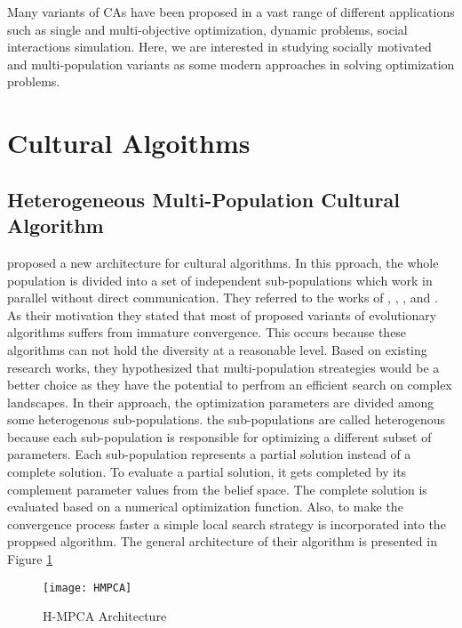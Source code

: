 \label{chapter:problem}

\newlength{\savedunitlength}
\setlength{\unitlength}{2em}

Many variants of CAs have been proposed in a vast range of different applications such as single and multi-objective optimization, dynamic problems, social interactions simulation. Here, we are interested in studying socially motivated and multi-population variants as some modern approaches in solving optimization problems.
\section{Cultural Algoithms}
\subsection{Heterogeneous Multi-Population Cultural Algorithm}
\cite{kobti2013heterogeneous} proposed a new architecture for cultural algorithms. In this pproach, the whole population is divided into a set of independent sub-populations which work in parallel without direct communication. They referred to the works of \cite{xu2010novel}, \cite{guo2011novel}, \cite{vasile2011inflationary}, and \cite{sharma2011reserve}. As their motivation they stated that most of proposed variants of evolutionary algorithms suffers from immature convergence. This occurs because these algorithms can not hold the diversity at a reasonable level. Based on existing research works, they hypothesized that multi-population streategies would be a better choice as they have the potential to perfrom an efficient search on complex landscapes. In their approach, the optimization parameters are divided among some heterogenous sub-populations. the sub-populations are called heterogenous because each sub-population is responsible for optimizing a different subset of parameters. Each sub-population represents a partial solution instead of a complete solution. To evaluate a partial solution, it gets completed by its complement parameter values from the belief space. The complete solution is evaluated based on a numerical optimization function. Also, to make the convergence process faster a simple local search strategy is incorporated into the proppsed algorithm. The general architecture of their algorithm is presented in Figure \ref{fig:HPMCA} \newline
\begin{figure}[h]
	\texttt{[image: HMPCA]}
	\centering
	\caption{H-MPCA Architecture \citet{kobti2013heterogeneous}}
	\label{fig:HPMCA}
\end{figure}
